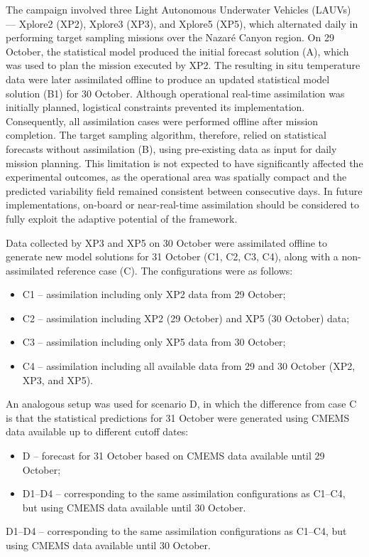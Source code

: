 The campaign involved three Light Autonomous Underwater Vehicles
(LAUVs) — Xplore2 (XP2), Xplore3 (XP3), and Xplore5 (XP5), which
alternated daily in performing target sampling missions over the
Nazaré Canyon region. On 29 October, the statistical model produced
the initial forecast solution (A), which was used to plan the mission
executed by XP2. The resulting in situ temperature data were later
assimilated offline to produce an updated statistical model solution
(B1) for 30 October. Although operational real-time assimilation was
initially planned, logistical constraints prevented its
implementation. Consequently, all assimilation cases were performed
offline after mission completion. The target sampling algorithm,
therefore, relied on statistical forecasts without assimilation (B),
using pre-existing data as input for daily mission planning. This
limitation is not expected to have significantly affected the
experimental outcomes, as the operational area was spatially compact
and the predicted variability field remained consistent between
consecutive days. In future implementations, on-board or
near-real-time assimilation should be considered to fully exploit the
adaptive potential of the framework.

Data collected by XP3 and XP5 on 30 October were assimilated offline
to generate new model solutions for 31 October (C1, C2, C3, C4), along
with a non-assimilated reference case (C). The configurations were as
follows:

\begin{itemize}
    \item C1 – assimilation including only XP2 data from 29 October;
    \item C2 – assimilation including XP2 (29 October) and XP5 (30 October) data;
    \item C3 – assimilation including only XP5 data from 30 October;
    \item C4 – assimilation including all available data from 29 and 30 October (XP2, XP3, and XP5).
\end{itemize}

An analogous setup was used for scenario D, in which the difference
from case C is that the statistical predictions for 31 October were
generated using CMEMS data available up to different cutoff dates:

\begin{itemize}
    \item D – forecast for 31 October based on CMEMS data available until 29 October;
    \item D1–D4 – corresponding to the same assimilation
      configurations as C1–C4, but using CMEMS data available until 30
      October.
\end{itemize}
D1–D4 – corresponding to the same assimilation configurations as
C1–C4, but using CMEMS data available until 30 October.

